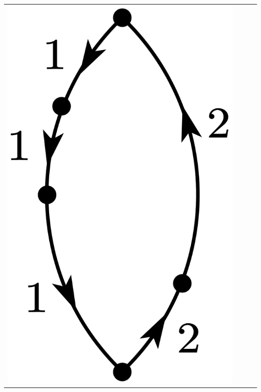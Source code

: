 \documentclass[a4paper]{book}
\newcounter{solution}[chapter]
\begin{document}
\begin{solution}
\begin{center}
\begin{tabular}{cccc}
		\begin{minipage}{0.22\linewidth}
		\centering
		\includegraphics[scale=1.0,trim=0 -4 0 -4]{./pictures/6.01/2.png}
		\captionof*{figure}{$\displaystyle (-1)^{3+1} \frac{ V^2_{11} V_{12} V_{21} V_{22} }{ ( E^{(0)}_1 - E^{(0)}_2)^4 }$}
		\end{minipage} &
		

\end{tabular}
\end{center}
\end{solution}
\end{document}
